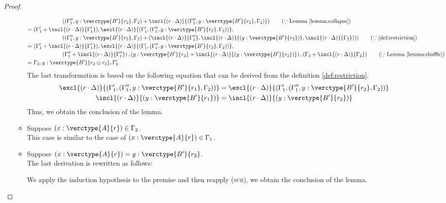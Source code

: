 \begin{proof}
\begin{itemize}
\begin{itemize}
\begin{align*}
&\hspace{5em} \left((\Gamma''_1, y:\verctype{B'}{r_2}, \Gamma_2)+\incl{(r\cdot\Delta)}{(\Gamma''_1, y:\verctype{B'}{r_2}, \Gamma_2)}\right) \tag{$\because$ Lemma \ref{lemma:collapse}}\\
=\ &(\Gamma'_1+\incl{(r\cdot\Delta)}{\Gamma'_1}),\excl{(r\cdot\Delta)}{(\Gamma'_1,(\Gamma''_1, y:\verctype{B'}{r_2}, \Gamma_2))},\\
&\hspace{5em} \left((\Gamma''_1, y:\verctype{B'}{r_2}, \Gamma_2) + \left(\incl{(r\cdot\Delta)}{\Gamma''_1}, \incl{(r\cdot\Delta)}{(y:\verctype{B'}{r_2})}, \incl{(r\cdot\Delta)}{\Gamma_2})\right)\right) \tag{$\because$ \ref{def:restriction}}\\
=\ &(\Gamma'_1+\incl{(r\cdot\Delta)}{\Gamma'_1}),\excl{(r\cdot\Delta)}{(\Gamma'_1,(\Gamma''_1, y:\verctype{B'}{r_2}, \Gamma_2))},\\
&\hspace{5em} \left(\Gamma''_1+\incl{(r\cdot\Delta)}{\Gamma''_1}\right), \left(y:\verctype{B'}{r_2}+ \incl{(r\cdot\Delta)}{(y:\verctype{B'}{r_2})}\right), \left(\Gamma_2 + \incl{(r\cdot\Delta)}{\Gamma_2}\right) \tag{$\because$ Lemma \ref{lemma:shuffle}}\\
=\ &\Gamma_3, y:\verctype{B'}{r_2\oplus r_3}, \Gamma'_3
\end{align*}
The last transformation is based on the following equation that can be derived from the definition \ref{def:restriction}.
\begin{align*}
\excl{(r\cdot\Delta)}{(\Gamma'_1,(\Gamma''_1, y:\verctype{B'}{r_1}, \Gamma_2))} &= \excl{(r\cdot\Delta)}{(\Gamma'_1,(\Gamma''_1, y:\verctype{B'}{r_2}, \Gamma_2))}\\
\incl{(r\cdot\Delta)}{(y:\verctype{B'}{r_1})} &= \incl{(r\cdot\Delta)}{(y:\verctype{B'}{r_2})}
\end{align*}
Thus, we obtain the conclusion of the lemma.

\item Suppose $(x:\verctype{A}{r})\in\Gamma_2$.\\
This case is similar to the case of $(x:\verctype{A}{r})\in\Gamma_1$.

\item Suppose $(x:\verctype{A}{r}) = y:\verctype{B'}{r_2}$.\\
The last derivation is rewritten as follows:
\begin{center}
    \begin{minipage}{.55\linewidth}
    \end{minipage}
\end{center}
We apply the induction hypothesis to the premise and then reapply (\textsc{sub}), we obtain the conclusion of the lemma.
\end{itemize}

\end{itemize}
\end{proof}

